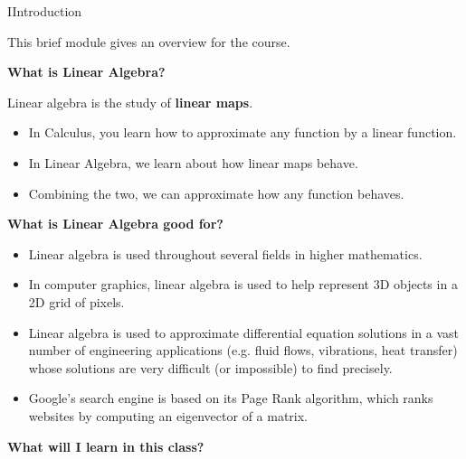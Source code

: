 \begin{module}{I}{Introduction}

\begin{remark}
  This brief module gives an overview for the course.
\end{remark}


\begin{applicationActivities}{1}{1}

\begin{remark} \textbf{What is Linear Algebra?}

  Linear algebra is the study of \textbf{linear maps}.

  \begin{itemize}
  \item In Calculus, you learn how to approximate any function by a
        linear function.
  \item In Linear Algebra, we learn about how linear maps behave.
  \item Combining the two, we can approximate how any function behaves.
  \end{itemize}
\end{remark}

\begin{remark} \textbf{What is Linear Algebra good for?}
  \begin{itemize}
  \item Linear algebra is used throughout several fields
        in higher mathematics.
  \item In computer graphics, linear algebra is used to help represent
        3D objects in a 2D grid of pixels.
  \item Linear algebra is used to approximate
        differential equation solutions in a vast number of engineering
        applications (e.g. fluid flows, vibrations, heat transfer) whose
        solutions are very difficult (or impossible) to find precisely.
  \item Google's search engine is based on its Page Rank algorithm, which
        ranks websites by computing an eigenvector of a matrix.
  \end{itemize}
\end{remark}

\begin{remark} \textbf{What will I learn in this class?}


\end{remark}
\end{applicationActivities}
\end{module}
